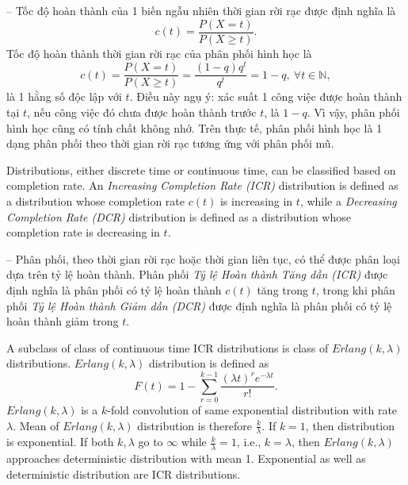 \documentclass{article}
\begin{document}
\begin{itemize}
\begin{itemize}
        -- Tốc độ hoàn thành của 1 biến ngẫu nhiên thời gian rời rạc được định nghĩa là
        \begin{equation*}
            c(t) = \frac{P(X = t)}{P(X\ge t)}.
        \end{equation*}
        Tốc độ hoàn thành thời gian rời rạc của phân phối hình học là
        \begin{equation*}
            c(t) = \frac{P(X = t)}{P(X\ge t)} = \frac{(1 - q)q^t}{q^t} = 1 - q, \ \forall t\in\mathbb{N},
        \end{equation*}
        là 1 hằng số độc lập với $t$. Điều này ngụ ý: xác suất 1 công việc được hoàn thành tại $t$, nếu công việc đó chưa được hoàn thành trước $t$, là $1 - q$. Vì vậy, phân phối hình học cũng có tính chất không nhớ. Trên thực tế, phân phối hình học là 1 dạng phân phối theo thời gian rời rạc tương ứng với phân phối mũ.

        Distributions, either discrete time or continuous time, can be classified based on completion rate. An {\it Increasing Completion Rate (ICR)} distribution is defined as a distribution whose completion rate $c(t)$ is increasing in $t$, while a {\it Decreasing Completion Rate (DCR)} distribution is defined as a distribution whose completion rate is decreasing in $t$.

        -- Phân phối, theo thời gian rời rạc hoặc thời gian liên tục, có thể được phân loại dựa trên tỷ lệ hoàn thành. Phân phối {\it Tỷ lệ Hoàn thành Tăng dần (ICR)} được định nghĩa là phân phối có tỷ lệ hoàn thành $c(t)$ tăng trong $t$, trong khi phân phối {\it Tỷ lệ Hoàn thành Giảm dần (DCR)} được định nghĩa là phân phối có tỷ lệ hoàn thành giảm trong $t$.

        A subclass of class of continuous time ICR distributions is class of $Erlang(k,\lambda)$ distributions. $Erlang(k,\lambda)$ distribution is defined as
        \begin{equation*}
            F(t) = 1 - \sum_{r=0}^{k-1} \frac{(\lambda t)^re^{-\lambda t}}{r!}.
        \end{equation*}
        $Erlang(k,\lambda)$ is a $k$-fold convolution of same exponential distribution with rate $\lambda$. Mean of $Erlang(k,\lambda)$ distribution is therefore $\frac{k}{\lambda}$. If $k = 1$, then distribution is exponential. If both $k,\lambda$ go to $\infty$ while $\frac{k}{\lambda} = 1$, i.e., $k = \lambda$, then $Erlang(k,\lambda)$ approaches deterministic distribution with mean 1. Exponential as well as deterministic distribution are ICR distributions.


\end{itemize}
\end{itemize}
\end{document}
